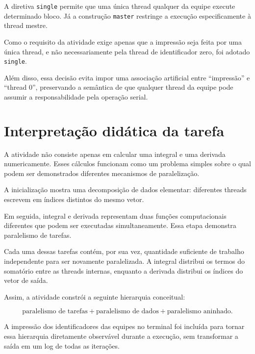 A diretiva \texttt{single} permite que uma única thread qualquer da equipe
execute determinado bloco. Já a construção \texttt{master} restringe a
execução especificamente à thread mestre.

Como o requisito da atividade exige apenas que a impressão seja feita por uma
única thread, e não necessariamente pela thread de identificador zero, foi
adotado \texttt{single}.

Além disso, essa decisão evita impor uma associação artificial entre
``impressão'' e ``thread 0'', preservando a semântica de que qualquer thread
da equipe pode assumir a responsabilidade pela operação serial.


\section{Interpretação didática da tarefa}
\label{sec:atvd08-interpretacao}

A atividade não consiste apenas em calcular uma integral e uma derivada
numericamente. Esses cálculos funcionam como um problema simples sobre o qual
podem ser demonstrados diferentes mecanismos de paralelização.

A inicialização mostra uma decomposição de dados elementar: diferentes
threads escrevem em índices distintos do mesmo vetor.

Em seguida, integral e derivada representam duas funções computacionais
diferentes que podem ser executadas simultaneamente. Essa etapa demonstra
paralelismo de tarefas.

Cada uma dessas tarefas contém, por sua vez, quantidade suficiente de trabalho
independente para ser novamente paralelizada. A integral distribui os termos
do somatório entre as threads internas, enquanto a derivada distribui os
índices do vetor de saída.

Assim, a atividade constrói a seguinte hierarquia conceitual:

\[
\boxed{
\text{paralelismo de tarefas}
+
\text{paralelismo de dados}
+
\text{paralelismo aninhado}
}.
\]

A impressão dos identificadores das equipes no terminal foi incluída para
tornar essa hierarquia diretamente observável durante a execução, sem
transformar a saída em um log de todas as iterações.


